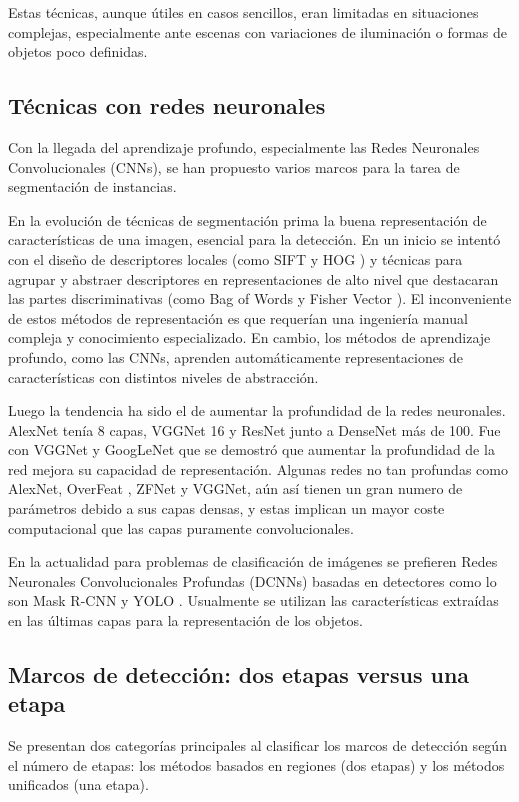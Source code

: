 Estas técnicas, aunque útiles en casos sencillos, eran limitadas en situaciones complejas, especialmente ante escenas con variaciones de iluminación o formas de objetos poco definidas.

\subsection{Técnicas con redes neuronales}
Con la llegada del aprendizaje profundo, especialmente las Redes Neuronales Convolucionales (CNNs), se han propuesto varios marcos para la tarea de segmentación de instancias.

En la evolución de técnicas de segmentación prima la buena representación de características de una imagen, esencial para la detección. En un inicio se intentó con el diseño de descriptores locales (como SIFT \cite{SIFT} y HOG \cite{HOG}) y técnicas para agrupar y abstraer descriptores en representaciones de alto nivel que destacaran las partes discriminativas (como Bag of Words \cite{BagOfWords} y Fisher Vector \cite{FisherVector}). El inconveniente de estos métodos de representación es que requerían una ingeniería manual compleja y conocimiento especializado. En cambio, los métodos de aprendizaje profundo, como las CNNs, aprenden automáticamente representaciones de características con distintos niveles de abstracción.

Luego la tendencia ha sido el de aumentar la profundidad de la redes neuronales. AlexNet \cite{AlexNet} tenía 8 capas, VGGNet \cite{VGGNet} 16 y ResNet \cite{ResNet} junto a DenseNet \cite{DenseNet} más de 100. Fue con VGGNet y GoogLeNet \cite{GoogleNet} que se demostró que aumentar la profundidad de la red mejora su capacidad de representación. Algunas redes no tan profundas como AlexNet, OverFeat \cite{OverFeat}, ZFNet \cite{ZFNet} y VGGNet, aún así tienen un gran numero de parámetros debido a sus capas densas, y estas implican un mayor coste computacional que las capas puramente convolucionales.

En la actualidad para problemas de clasificación de imágenes se prefieren Redes Neuronales Convolucionales Profundas (DCNNs) basadas en detectores como lo son Mask R-CNN \cite{MaskRCNN} y YOLO \cite{YOLO}. Usualmente se utilizan las características extraídas en las últimas capas para la representación de los objetos.

\subsection{Marcos de detección: dos etapas versus una etapa}
\label{sec:anexo_marcos}
Se presentan dos categorías principales al clasificar los marcos de detección según el número de etapas: los métodos basados en regiones (dos etapas) y los métodos unificados (una etapa).


